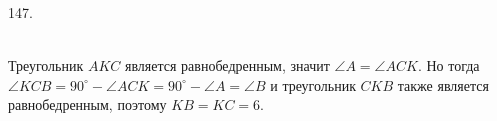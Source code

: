 147. \begin{figure}[ht!]
\end{figure}\\
Треугольник $AKC$ является равнобедренным, значит $\angle A=\angle ACK.$ Но тогда $\angle KCB=90^\circ-\angle ACK=90^\circ-\angle A=\angle B$ и треугольник $CKB$ также является равнобедренным, поэтому $KB=KC=6.$\\
